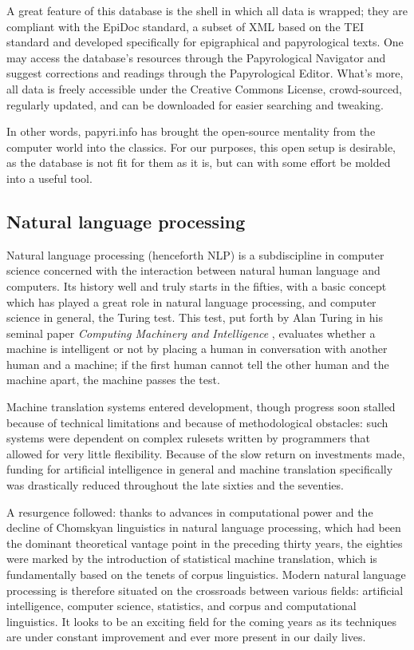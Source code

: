 A great feature of this database is the shell in which all data is
wrapped; they are compliant with the EpiDoc standard, a subset of XML
based on the TEI standard and developed specifically for epigraphical
and papyrological texts.  One may access the database’s resources
through the Papyrological Navigator and suggest corrections and
readings through the Papyrological Editor. What’s more, all data is
freely accessible under the Creative Commons License, crowd-sourced,
regularly updated, and can be downloaded for easier searching and
tweaking.

In other words, papyri.info has brought the open-source mentality from
the computer world into the classics. For our purposes, this open
setup is desirable, as the database is not fit for them as it is, but
can with some effort be molded into a useful tool.

\subsection{Natural language processing}

Natural language processing (henceforth NLP) is a subdiscipline in
computer science concerned with the interaction between natural human
language and computers. Its history well and truly starts in the
fifties, with a basic concept which has played a great role in natural
language processing, and computer science in general, the Turing
test. This test, put forth by Alan Turing in his seminal paper
\textit{Computing Machinery and Intelligence} \citep{turing1950},
evaluates whether a machine is intelligent or not by placing a human
in conversation with another human and a machine; if the first human
cannot tell the other human and the machine apart, the machine passes
the test.

Machine translation systems entered development, though progress soon
stalled because of technical limitations and because of methodological
obstacles: such systems were dependent on complex rulesets written by
programmers that allowed for very little flexibility. Because of the
slow return on investments made, funding for artificial intelligence
in general and machine translation specifically was drastically
reduced throughout the late sixties and the seventies.

A resurgence followed: thanks to advances in computational power and
the decline of Chomskyan linguistics in natural language processing,
which had been the dominant theoretical vantage point in the preceding
thirty years, the eighties were marked by the introduction of
statistical machine translation, which is fundamentally based on the
tenets of corpus linguistics. Modern natural language processing is
therefore situated on the crossroads between various fields:
artificial intelligence, computer science, statistics, and corpus and
computational linguistics. It looks to be an exciting field for the
coming years as its techniques are under constant improvement and ever
more present in our daily lives.

